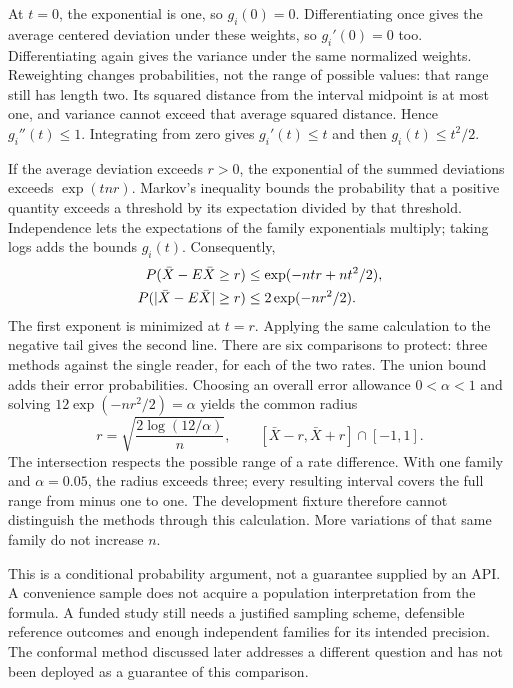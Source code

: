 \documentclass[12pt,a4paper,oneside,openany]{book}
\begin{document}
At $t=0$, the exponential is one, so $g_i(0)=0$. Differentiating once gives the
average centered deviation under these weights, so $g_i'(0)=0$ too.
Differentiating again gives the variance under the same normalized weights.
Reweighting changes probabilities, not the range of possible values: that range
still has length two. Its squared distance from the interval midpoint is at
most one, and variance cannot exceed that average squared distance. Hence
$g_i''(t)\leq1$. Integrating from zero gives $g_i'(t)\leq t$ and then
$g_i(t)\leq t^2/2$.

If the average deviation exceeds $r>0$, the exponential of the summed deviations
exceeds $\exp(tnr)$. Markov's inequality bounds the probability that a positive
quantity exceeds a threshold by its expectation divided by that threshold.
Independence lets the expectations of the family exponentials multiply; taking
logs adds the bounds $g_i(t)$. Consequently,
\begin{align}
 P(\bar X-E\bar X\geq r)
 &\leq \exp(-ntr+nt^2/2),\notag\\
 P(|\bar X-E\bar X|\geq r)
 &\leq 2\exp(-nr^2/2).
 \label{eq:family-tail}
\end{align}
The first exponent is minimized at $t=r$. Applying the same calculation to the
negative tail gives the second line. There are six comparisons to protect:
three methods against the single reader, for each of the two rates. The union
bound adds their error probabilities. Choosing an overall error allowance
$0<\alpha<1$ and solving $12\exp(-nr^2/2)=\alpha$ yields the common radius
\begin{equation}
 r=\sqrt{\frac{2\log(12/\alpha)}{n}},\qquad
 [\bar X-r,\bar X+r]\cap[-1,1].
 \label{eq:family-interval}
\end{equation}
The intersection respects the possible range of a rate difference. With one
family and $\alpha=0.05$, the radius exceeds three; every resulting interval
covers the full range from minus one to one. The development fixture therefore
cannot distinguish the methods through this calculation. More variations of
that same family do not increase $n$.

This is a conditional probability argument, not a guarantee supplied by an
API. A convenience sample does not acquire a population interpretation from
the formula. A funded study still needs a justified sampling scheme, defensible
reference outcomes and enough independent families for its intended precision.
The conformal method discussed later addresses a different question and has
not been deployed as a guarantee of this comparison.
\end{document}
